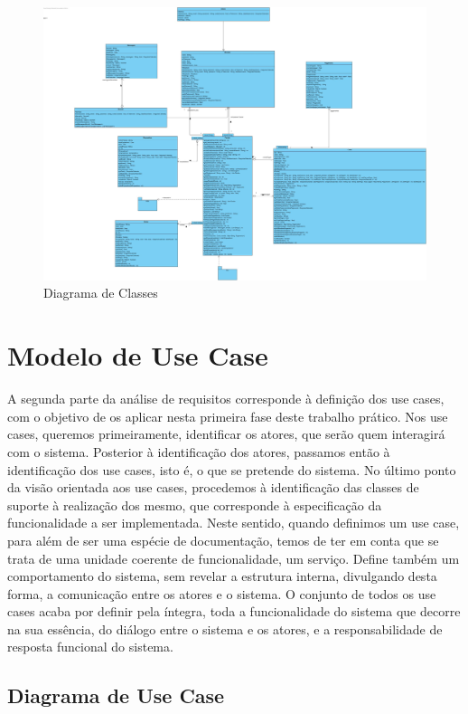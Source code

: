 \begin{figure}[htb!]
	\centering
	\includegraphics[scale=0.2]{imagens/diagramaClasses/DiagramaClasse}  
	\caption{Diagrama de Classes }  
\end{figure}


\newpage

\section{Modelo de Use Case}
A segunda parte da análise de requisitos corresponde à definição dos use cases, com o objetivo de os aplicar nesta primeira fase deste trabalho prático. Nos use cases, queremos primeiramente, identificar os atores, que serão quem interagirá com o sistema.
Posterior à identificação dos atores, passamos então à identificação dos use cases, isto é, o que se pretende do sistema. No último ponto da visão orientada aos use cases, procedemos à identificação das classes de suporte à realização dos mesmo, que corresponde à especificação da funcionalidade a ser implementada.
Neste sentido, quando definimos um use case, para além de ser uma espécie de documentação, temos de ter em conta que se trata de uma unidade coerente de funcionalidade, um serviço. Define também um comportamento do sistema, sem revelar a estrutura interna, divulgando desta forma, a comunicação entre os atores e o sistema.
O conjunto de todos os use cases acaba por definir pela íntegra, toda a funcionalidade do sistema que decorre na sua essência, do diálogo entre o sistema e os atores, e a responsabilidade de resposta funcional do sistema.


\subsection{Diagrama de Use Case}



